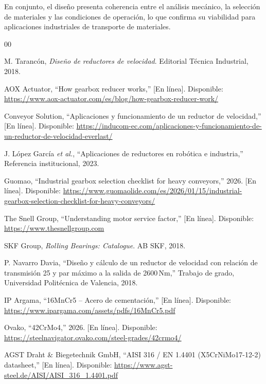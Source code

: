 \documentclass[conference]{IEEEtran}
\begin{document}
En conjunto, el diseño presenta coherencia entre el análisis mecánico, la selección de
materiales y las condiciones de operación, lo que confirma su viabilidad para aplicaciones
industriales de transporte de materiales.

\begin{thebibliography}{00}

M. Tarancón, \textit{Diseño de reductores de velocidad}.
Editorial Técnica Industrial, 2018.

AOX Actuator, ``How gearbox reducer works,'' [En línea].
Disponible: \url{https://www.aox-actuator.com/es/blog/how-gearbox-reducer-work/}

Conveyor Solution, ``Aplicaciones y funcionamiento de un reductor de velocidad,''
[En línea]. Disponible:
\url{https://inducom-ec.com/aplicaciones-y-funcionamiento-de-un-reductor-de-velocidad-everlast/}

J. López García \textit{et al.}, ``Aplicaciones de reductores en robótica e industria,''
Referencia institucional, 2023.

Guomao, ``Industrial gearbox selection checklist for heavy conveyors,'' 2026. [En línea].
Disponible:
\url{https://www.guomaolide.com/es/2026/01/15/industrial-gearbox-selection-checklist-for-heavy-conveyors/}

The Snell Group, ``Understanding motor service factor,'' [En línea].
Disponible: \url{https://www.thesnellgroup.com}

SKF Group, \textit{Rolling Bearings: Catalogue}. AB SKF, 2018.

P. Navarro Davia, ``Diseño y cálculo de un reductor de velocidad con relación de
transmisión 25 y par máximo a la salida de 2600\,Nm,'' Trabajo de grado, Universidad
Politécnica de Valencia, 2018.

IP Argama, ``16MnCr5 -- Acero de cementación,'' [En línea].
Disponible: \url{https://www.ipargama.com/assets/pdfs/16MnCr5.pdf}

Ovako, ``42CrMo4,'' 2026. [En línea].
Disponible: \url{https://steelnavigator.ovako.com/steel-grades/42crmo4/}

AGST Draht \& Biegetechnik GmbH, ``AISI 316 / EN 1.4401 (X5CrNiMo17-12-2) datasheet,''
[En línea]. Disponible: \url{https://www.agst-steel.de/AISI/AISI_316_1.4401.pdf}


\end{thebibliography}
\end{document}
